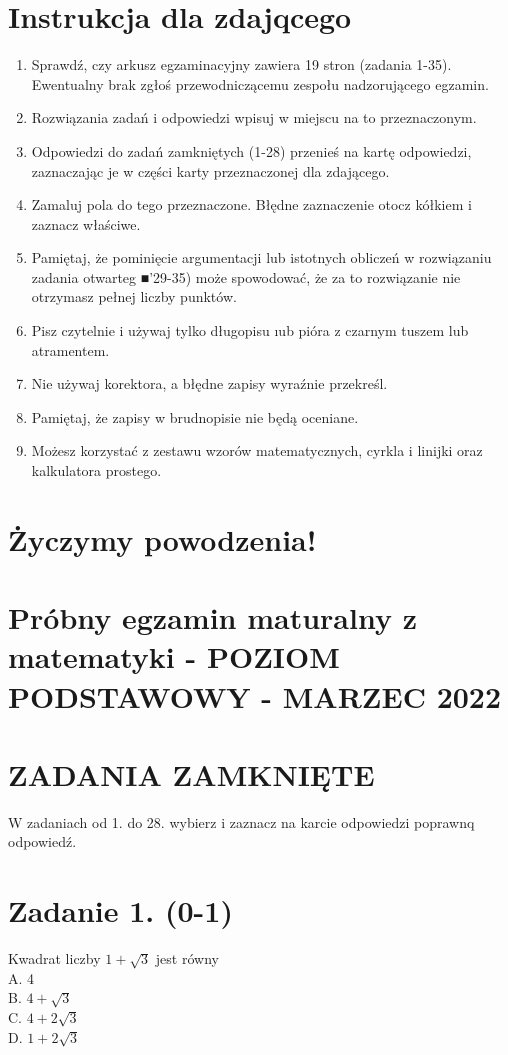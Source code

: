 \documentclass[10pt]{article}
\begin{document}
\section*{Instrukcja dla zdajqcego}
\begin{enumerate}
  \item Sprawdź, czy arkusz egzaminacyjny zawiera 19 stron (zadania 1-35). Ewentualny brak zgłoś przewodniczącemu zespołu nadzorującego egzamin.
  \item Rozwiązania zadań i odpowiedzi wpisuj w miejscu na to przeznaczonym.
  \item Odpowiedzi do zadań zamkniętych (1-28) przenieś na kartę odpowiedzi, zaznaczając je w części karty przeznaczonej dla zdającego.
  \item Zamaluj pola do tego przeznaczone. Błędne zaznaczenie otocz kółkiem i zaznacz właściwe.
  \item Pamiętaj, że pominięcie argumentacji lub istotnych obliczeń w rozwiązaniu zadania otwarteg ■'29-35) może spowodować, że za to rozwiązanie nie otrzymasz pełnej liczby punktów.
  \item Pisz czytelnie i używaj tylko długopisu ıub pióra z czarnym tuszem lub atramentem.
  \item Nie używaj korektora, a błędne zapisy wyraźnie przekreśl.
  \item Pamiętaj, że zapisy w brudnopisie nie będą oceniane.
  \item Możesz korzystać z zestawu wzorów matematycznych, cyrkla i linijki oraz kalkulatora prostego.
\end{enumerate}

\section*{Życzymy powodzenia!}
\section*{Próbny egzamin maturalny z matematyki - POZIOM PODSTAWOWY - MARZEC 2022}
\section*{ZADANIA ZAMKNIĘTE}
W zadaniach od 1. do 28. wybierz i zaznacz na karcie odpowiedzi poprawnq odpowiedź.

\section*{Zadanie 1. (0-1)}
Kwadrat liczby \(1+\sqrt{3}\) jest równy\\
A. 4\\
B. \(4+\sqrt{3}\)\\
C. \(4+2 \sqrt{3}\)\\
D. \(1+2 \sqrt{3}\)
\end{document}
